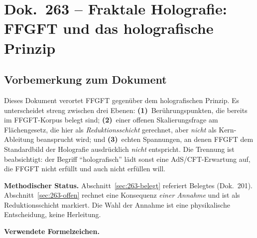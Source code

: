 
\chapter*{Dok.~263 -- Fraktale Holografie: FFGFT und das holografische Prinzip}

\section*{Vorbemerkung zum Dokument}

Dieses Dokument verortet FFGFT gegenüber dem holografischen Prinzip. Es
unterscheidet streng zwischen drei Ebenen: \textbf{(1)}~Berührungspunkten,
die bereits im FFGFT-Korpus belegt sind; \textbf{(2)}~einer offenen
Skalierungsfrage am Flächengesetz, die hier als \emph{Reduktionsschicht}
gerechnet, aber \emph{nicht} als Kern-Ableitung beansprucht wird; und
\textbf{(3)}~echten Spannungen, an denen FFGFT dem Standardbild der
Holografie ausdrücklich \emph{nicht} entspricht. Die Trennung ist
beabsichtigt: der Begriff \enquote{holografisch} lädt sonst eine
AdS/CFT-Erwartung auf, die FFGFT nicht erfüllt und auch nicht erfüllen will.

\medskip

\textbf{Methodischer Status.} Abschnitt~\ref{sec:263-belegt} referiert
Belegtes (Dok.~201). Abschnitt~\ref{sec:263-offen} rechnet eine Konsequenz
\emph{einer Annahme} und ist als Reduktionsschicht markiert. Die Wahl der
Annahme ist eine physikalische Entscheidung, keine Herleitung.

\medskip

\textbf{Verwendete Formelzeichen.}

